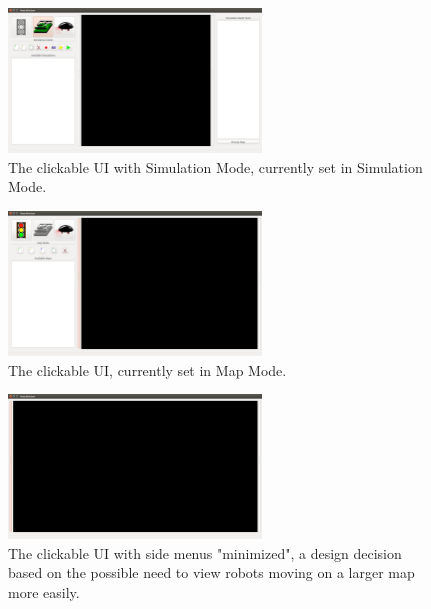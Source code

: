 \begin{figure}[H]
\begin{center}
\includegraphics[width=0.60\textwidth]{./Images/Sprint1_clickableUI_SimulationMode}
\end{center}
\caption{The clickable UI with Simulation Mode, currently set in Simulation Mode.  \label{clickableuisimulation}}
\end{figure}

\begin{figure}[H]
\begin{center}
\includegraphics[width=0.60\textwidth]{./Images/Sprint1_clickableUI_MapMode}
\end{center}
\caption{The clickable UI, currently set in Map Mode. \label{clickableuimap}}
\end{figure}

\begin{figure}[H]
\begin{center}
\includegraphics[width=0.60\textwidth]{./Images/Sprint1_clickableUI_NoMenus}
\end{center}
\caption{The clickable UI with side menus "minimized", a design decision based on the possible need to view robots moving on a larger map more easily. \label{clickableuinomenus}}
\end{figure}

